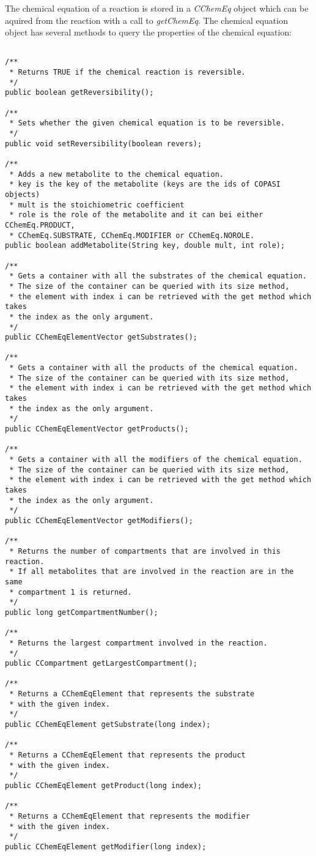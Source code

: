 \documentclass[a4,12pt]{article}
\begin{document}
The chemical equation of a reaction is stored in a \textit{CChemEq} object which can be aquired from the reaction with a call to \textit{getChemEq}.
The chemical equation object has several methods to query the properties of the chemical equation:

\begin{lstlisting}

/**
 * Returns TRUE if the chemical reaction is reversible.
 */
public boolean getReversibility();

/**
 * Sets whether the given chemical equation is to be reversible.
 */
public void setReversibility(boolean revers);

/**
 * Adds a new metabolite to the chemical equation.
 * key is the key of the metabolite (keys are the ids of COPASI objects)
 * mult is the stoichiometric coefficient
 * role is the role of the metabolite and it can bei either CChemEq.PRODUCT,
 * CChemEq.SUBSTRATE, CChemEq.MODIFIER or CChemEq.NOROLE.
public boolean addMetabolite(String key, double mult, int role);

/**
 * Gets a container with all the substrates of the chemical equation.
 * The size of the container can be queried with its size method,
 * the element with index i can be retrieved with the get method which takes
 * the index as the only argument.
 */
public CChemEqElementVector getSubstrates();

/**
 * Gets a container with all the products of the chemical equation.
 * The size of the container can be queried with its size method,
 * the element with index i can be retrieved with the get method which takes
 * the index as the only argument.
 */
public CChemEqElementVector getProducts();

/**
 * Gets a container with all the modifiers of the chemical equation.
 * The size of the container can be queried with its size method,
 * the element with index i can be retrieved with the get method which takes
 * the index as the only argument.
 */
public CChemEqElementVector getModifiers();

/**
 * Returns the number of compartments that are involved in this reaction.
 * If all metabolites that are involved in the reaction are in the same
 * compartment 1 is returned.
 */
public long getCompartmentNumber();

/**
 * Returns the largest compartment involved in the reaction.
 */
public CCompartment getLargestCompartment();

/**
 * Returns a CChemEqElement that represents the substrate
 * with the given index.
 */
public CChemEqElement getSubstrate(long index);

/**
 * Returns a CChemEqElement that represents the product
 * with the given index.
 */
public CChemEqElement getProduct(long index);

/**
 * Returns a CChemEqElement that represents the modifier
 * with the given index.
 */
public CChemEqElement getModifier(long index);
\end{lstlisting}
\end{document}
